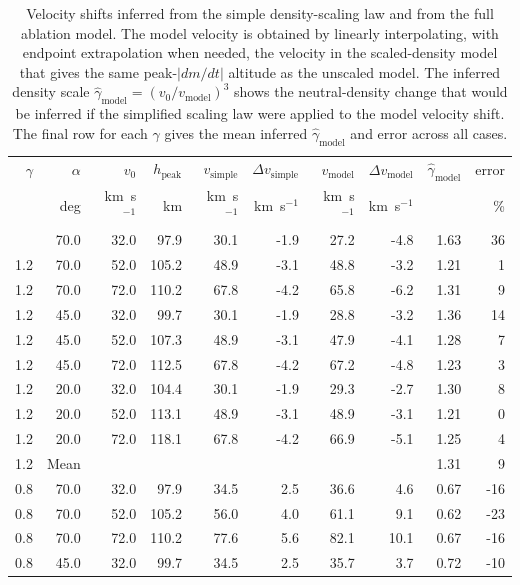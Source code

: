 \begin{table}
\caption{Velocity shifts inferred from the simple density-scaling law and from the full ablation model. The model velocity is obtained by linearly interpolating, with endpoint extrapolation when needed, the velocity in the scaled-density model that gives the same peak-$|dm/dt|$ altitude as the unscaled model. The inferred density scale $\hat{\gamma}_{\mathrm{model}}=(v_0/v_{\mathrm{model}})^3$ shows the neutral-density change that would be inferred if the simplified scaling law were applied to the model velocity shift. The final row for each $\gamma$ gives the mean inferred $\hat{\gamma}_{\mathrm{model}}$ and error across all cases.}
\label{tab:velocity-shift}
\begin{tabular}{rrrrrrrrrr}
\tophline
$\gamma$ & $\alpha$ & $v_0$ & $h_{\mathrm{peak}}$ & $v_{\mathrm{simple}}$ & $\Delta v_{\mathrm{simple}}$ & $v_{\mathrm{model}}$ & $\Delta v_{\mathrm{model}}$ & $\hat{\gamma}_{\mathrm{model}}$ & error \\
 & deg & km~s$^{-1}$ & km & km~s$^{-1}$ & km~s$^{-1}$ & km~s$^{-1}$ & km~s$^{-1}$ &  & \% \\
\middlehline
1.2 & 70.0 & 32.0 & 97.9 & 30.1 & -1.9 & 27.2 & -4.8 & 1.63 & 36 \\
1.2 & 70.0 & 52.0 & 105.2 & 48.9 & -3.1 & 48.8 & -3.2 & 1.21 & 1 \\
1.2 & 70.0 & 72.0 & 110.2 & 67.8 & -4.2 & 65.8 & -6.2 & 1.31 & 9 \\
1.2 & 45.0 & 32.0 & 99.7 & 30.1 & -1.9 & 28.8 & -3.2 & 1.36 & 14 \\
1.2 & 45.0 & 52.0 & 107.3 & 48.9 & -3.1 & 47.9 & -4.1 & 1.28 & 7 \\
1.2 & 45.0 & 72.0 & 112.5 & 67.8 & -4.2 & 67.2 & -4.8 & 1.23 & 3 \\
1.2 & 20.0 & 32.0 & 104.4 & 30.1 & -1.9 & 29.3 & -2.7 & 1.30 & 8 \\
1.2 & 20.0 & 52.0 & 113.1 & 48.9 & -3.1 & 48.9 & -3.1 & 1.21 & 0 \\
1.2 & 20.0 & 72.0 & 118.1 & 67.8 & -4.2 & 66.9 & -5.1 & 1.25 & 4 \\
1.2 & Mean & & & & & & & 1.31 & 9 \\
0.8 & 70.0 & 32.0 & 97.9 & 34.5 & 2.5 & 36.6 & 4.6 & 0.67 & -16 \\
0.8 & 70.0 & 52.0 & 105.2 & 56.0 & 4.0 & 61.1 & 9.1 & 0.62 & -23 \\
0.8 & 70.0 & 72.0 & 110.2 & 77.6 & 5.6 & 82.1 & 10.1 & 0.67 & -16 \\
0.8 & 45.0 & 32.0 & 99.7 & 34.5 & 2.5 & 35.7 & 3.7 & 0.72 & -10 \\

\end{tabular}
\end{table}
